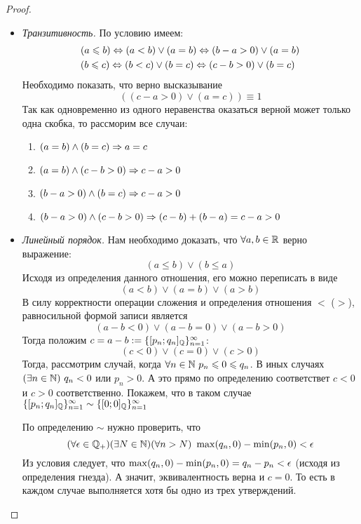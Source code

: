 \begin{proof}
\begin{itemize}
        \item \textit{Транзитивность.} По условию имеем:
            \begin{align*}
                &(a \leqslant b) \Leftrightarrow (a < b) \vee (a = b) \Leftrightarrow (b - a > 0) \vee (a = b) \\
                &(b \leqslant c) \Leftrightarrow (b < c) \vee (b = c) \Leftrightarrow (c - b > 0) \vee (b = c)
            \end{align*}
            Необходимо показать, что верно высказывание
            \[
                ((c - a > 0) \vee (a = c)) \equiv 1
            \]
            Так как одновременно из одного неравенства
            оказаться верной может только одна скобка, то
            рассморим все случаи:
            \begin{enumerate}
                \item $(a = b) \wedge (b = c) \Rightarrow a = c$
                \item $(a = b) \wedge (c - b > 0) \Rightarrow c - a > 0$
                \item $(b - a > 0) \wedge (b = c) \Rightarrow c - a > 0$
                \item $(b - a > 0) \wedge (c - b > 0) \Rightarrow
                    (c - b) + (b - a) = c - a > 0$
            \end{enumerate}
        \item \textit{Линейный порядок.} Нам необходимо доказать,
            что $\forall a, b \in \mathbb{R}$ верно выражение:
            \[
                (a \le b) \vee (b \le a)
            \]
            Исходя из определения данного отношения, его можно переписать в виде
            \[
                (a < b) \vee (a = b) \vee (a > b)
            \]
            В силу корректности операции сложения и определения отношения $<$ ($>$), равносильной формой записи является
            \[
                (a - b < 0) \vee (a - b = 0) \vee (a - b > 0)
            \]
            Тогда положим $c = a - b := \{[p_n; q_n]_{\mathbb{Q}}\}_{n = 1}^\infty$:
            \[
                (c < 0) \vee (c = 0) \vee (c > 0)
            \]
            Тогда, рассмотрим случай, когда $\forall n \in \mathbb{N}\ p_n \leqslant 0 \leqslant q_n$. В иных
            случаях $(\exists n \in \mathbb{N})\ q_n < 0$ или $p_n > 0$. А это
            прямо по определению соответствет $c < 0$ и $c > 0$ соответственно.
            Покажем, что в таком случае $\{[p_n;q_n]_{\mathbb{Q}}\}_{n = 1}^\infty \sim \{[0;0]_{\mathbb{Q}}\}_{n = 1}^\infty$
            
            По определению $\sim$ нужно проверить, что
            \[
                (\forall \epsilon \in \mathbb{Q}_+)(\exists N \in \mathbb{N})
                (\forall n > N)\ \max(q_n, 0) - \min(p_n, 0) < \epsilon
            \]
            Из условия следует, что $\max(q_n, 0) - \min(p_n, 0)
            = q_n - p_n < \epsilon$ (исходя из определения гнезда).
            А значит, эквивалентность верна и $c = 0$. То есть
            в каждом случае выполняется хотя бы одно из трех
            утверждений. 
    \end{itemize}
\end{proof}


